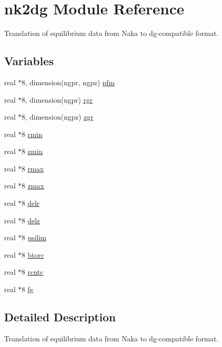 \hypertarget{namespacenk2dg}{
\section{nk2dg Module Reference}
\label{namespacenk2dg}
}
Translation of equilibrium data from Naka to dg-compatible format.  


\subsection*{Variables}
\begin{CompactItemize}
\item 
real $\ast$8, dimension(ngpr, ngpz) \hyperlink{namespacenk2dg_733992eb6e80ce656c32d6d353c4677b}{pfm}
\item 
real $\ast$8, dimension(ngpr) \hyperlink{namespacenk2dg_cf5c5ade5f9197d1f9a6a9730e570159}{rgr}
\item 
real $\ast$8, dimension(ngpz) \hyperlink{namespacenk2dg_fe36aa20b7f59d22623f4125397651d6}{zgr}
\item 
real $\ast$8 \hyperlink{namespacenk2dg_395609fb530be70486fc118f6f819b3a}{rmin}
\item 
real $\ast$8 \hyperlink{namespacenk2dg_08d442b8e9fa8d3621dbd6c09ee2b4be}{zmin}
\item 
real $\ast$8 \hyperlink{namespacenk2dg_72fec23caa6a548271a5e18c11a1dce9}{rmax}
\item 
real $\ast$8 \hyperlink{namespacenk2dg_ba6a5a016ae20d3d4055b43ed890a3b2}{zmax}
\item 
real $\ast$8 \hyperlink{namespacenk2dg_f992f0e8d5ad4ef0f9529778eda2cdff}{delr}
\item 
real $\ast$8 \hyperlink{namespacenk2dg_654247a44246ac3e92803f639aaa7007}{delz}
\item 
real $\ast$8 \hyperlink{namespacenk2dg_af4c53f2a1030fd743abb4a613562faa}{psilim}
\item 
real $\ast$8 \hyperlink{namespacenk2dg_f54459b76d986d4d7eec7446c33e6356}{btorc}
\item 
real $\ast$8 \hyperlink{namespacenk2dg_b8da20bfe7c672322e034214f4902319}{rcntc}
\item 
real $\ast$8 \hyperlink{namespacenk2dg_309a619ea56590d21043369e3f3f50e7}{fg}
\end{CompactItemize}


\subsection{Detailed Description}
Translation of equilibrium data from Naka to dg-compatible format. 

